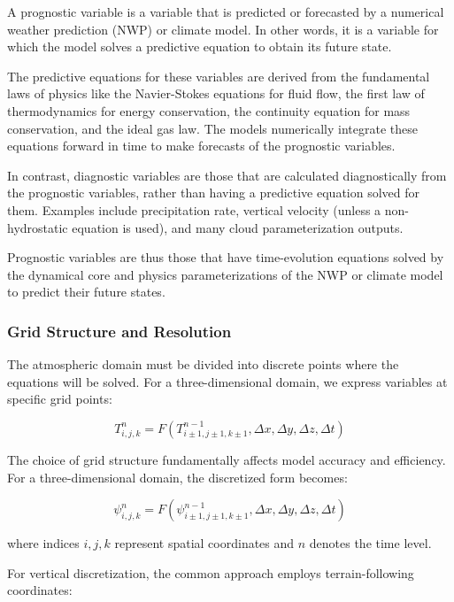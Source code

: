 \documentclass{article}
\begin{document}
A prognostic variable is a variable that is predicted or forecasted by a numerical weather prediction (NWP) or climate model. In other words, it is a variable for which the model solves a predictive equation to obtain its future state.

The predictive equations for these variables are derived from the fundamental laws of physics like the Navier-Stokes equations for fluid flow, the first law of thermodynamics for energy conservation, the continuity equation for mass conservation, and the ideal gas law. The models numerically integrate these equations forward in time to make forecasts of the prognostic variables.

In contrast, diagnostic variables are those that are calculated diagnostically from the prognostic variables, rather than having a predictive equation solved for them. Examples include precipitation rate, vertical velocity (unless a non-hydrostatic equation is used), and many cloud parameterization outputs.

Prognostic variables are thus those that have time-evolution equations solved by the dynamical core and physics parameterizations of the NWP or climate model to predict their future states.

\subsubsection{Grid Structure and Resolution}

The atmospheric domain must be divided into discrete points where the equations will be solved. For a three-dimensional domain, we express variables at specific grid points:

\begin{equation}
T_{i,j,k}^n = F(T_{i\pm1,j\pm1,k\pm1}^{n-1}, \Delta x, \Delta y, \Delta z, \Delta t)
\label{eq:60}
\end{equation}

The choice of grid structure fundamentally affects model accuracy and efficiency. For a three-dimensional domain, the discretized form becomes:

\begin{equation}
\psi_{i,j,k}^n = F(\psi_{i\pm1,j\pm1,k\pm1}^{n-1}, \Delta x, \Delta y, \Delta z, \Delta t)
\label{eq:61}
\end{equation}

where indices $i,j,k$ represent spatial coordinates and $n$ denotes the time level.

For vertical discretization, the common approach employs terrain-following coordinates:
\end{document}
